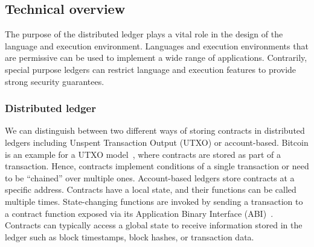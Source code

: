 
\subsection{Technical overview}
The purpose of the distributed ledger plays a vital role in the design of the language and execution environment.
Languages and execution environments that are permissive can be used to implement a wide range of applications. 
Contrarily, special purpose ledgers can restrict language and execution features to provide strong security guarantees.

\subsubsection{Distributed ledger}
We can distinguish between two different ways of storing contracts in distributed ledgers including Unspent Transaction Output (UTXO) or account-based.
Bitcoin is an example for a UTXO model~\cite{Nakamoto2008,Covaci2018}, where contracts are stored as part of a transaction. %
Hence, contracts implement conditions of a single transaction or need to be ``chained'' over multiple ones.
Account-based ledgers store contracts at a specific address.
Contracts have a local state, and their functions can be called multiple times.
State-changing functions are invoked by sending a transaction to a contract function exposed via its Application Binary Interface (ABI)~\cite{Wood2014,Sergey2018,OCamlProSAS2018}.
Contracts can typically access a global state to receive information stored in the ledger such as block timestamps, block hashes, or transaction data. 

